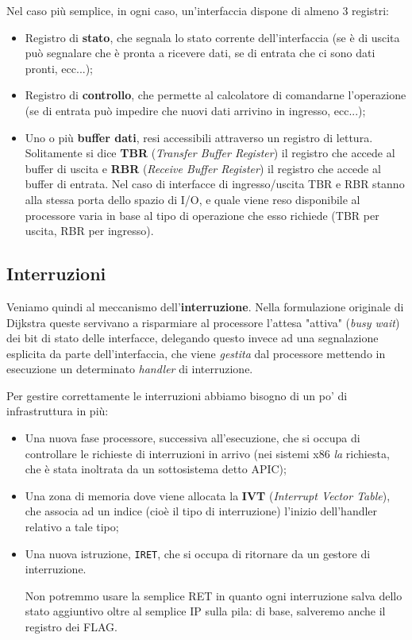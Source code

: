 \documentclass[a4paper,11pt]{article}
\begin{document}
Nel caso più semplice, in ogni caso, un'interfaccia dispone di almeno 3 registri:
\begin{itemize}
	\item Registro di \textbf{stato}, che segnala lo stato corrente dell'interfaccia (se è di uscita può segnalare che è pronta a ricevere dati, se di entrata che ci sono dati pronti, ecc...);
	\item Registro di \textbf{controllo}, che permette al calcolatore di comandarne l'operazione (se di entrata può impedire che nuovi dati arrivino in ingresso, ecc...);
	\item Uno o più \textbf{buffer dati}, resi accessibili attraverso un registro di lettura. Solitamente si dice \textbf{TBR} (\textit{Transfer Buffer Register}) il registro che accede al buffer di uscita e \textbf{RBR} (\textit{Receive Buffer Register}) il registro che accede al buffer di entrata. Nel caso di interfacce di ingresso/uscita TBR e RBR stanno alla stessa porta dello spazio di I/O, e quale viene reso disponibile al processore varia in base al tipo di operazione che esso richiede (TBR per uscita, RBR per ingresso).
\end{itemize}

\subsection{Interruzioni}
Veniamo quindi al meccanismo dell'\textbf{interruzione}.
Nella formulazione originale di Dijkstra queste servivano a risparmiare al processore l'attesa "attiva" (\textit{busy wait}) dei bit di stato delle interfacce, delegando questo invece ad una segnalazione esplicita da parte dell'interfaccia, che viene \textit{gestita} dal processore mettendo in esecuzione un determinato \textit{handler} di interruzione.

Per gestire correttamente le interruzioni abbiamo bisogno di un po' di infrastruttura in più:
\begin{itemize}
	\item Una nuova fase processore, successiva all'esecuzione, che si occupa di controllare le richieste di interruzioni in arrivo (nei sistemi x86 \textit{la} richiesta, che è stata inoltrata da un sottosistema detto APIC);
	\item Una zona di memoria dove viene allocata la \textbf{IVT} (\textit{Interrupt Vector Table}), che associa ad un indice (cioè il tipo di interruzione) l'inizio dell'handler relativo a tale tipo;
	\item Una nuova istruzione, \lstinline|IRET|, che si occupa di ritornare da un gestore di interruzione.

		Non potremmo usare la semplice RET in quanto ogni interruzione salva dello stato aggiuntivo oltre al semplice IP sulla pila: di base, salveremo anche il registro dei FLAG.
\end{itemize}
\end{document}
